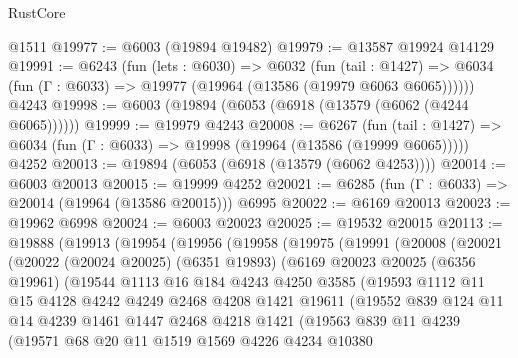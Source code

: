 \begin{lexlean}{RustCore}
\begin{coremodule}
    @1511
@19977 := @6003 (@19894 @19482)
@19979 := @13587 @19924 @14129
@19991 := @6243
    (fun (lets : @6030) =>
    @6032
      (fun (tail : @1427) =>
      @6034 (fun (Γ : @6033) => @19977 (@19964 (@13586 (@19979 @6063 @6065))))))
    @4243
@19998 := @6003 (@19894 (@6053 (@6918 (@13579 (@6062 (@4244 @6065))))))
@19999 := @19979 @4243
@20008 := @6267
    (fun (tail : @1427) => @6034 (fun (Γ : @6033) => @19998 (@19964 (@13586 (@19999 @6065)))))
    @4252
@20013 := @19894 (@6053 (@6918 (@13579 (@6062 @4253))))
@20014 := @6003 @20013
@20015 := @19999 @4252
@20021 := @6285 (fun (Γ : @6033) => @20014 (@19964 (@13586 @20015))) @6995
@20022 := @6169 @20013
@20023 := @19962 @6998
@20024 := @6003 @20023
@20025 := @19532 @20015
@20113 := @19888
    (@19913
      (@19954
        (@19956
          (@19958
            (@19975
              (@19991
                (@20008
                  (@20021
                    (@20022
                      (@20024 @20025)
                      (@6351 @19893)
                      (@6169
                        @20023
                        @20025
                        (@6356 @19961)
                        (@19544
                          @1113
                          @16
                          @184
                          @4243
                          @4250
                          @3585
                          (@19593
                            @1112
                            @11
                            @15
                            @4128
                            @4242
                            @4249
                            @2468
                            @4208
                            @1421
                            @19611
                            (@19552
                              @839
                              @124
                              @11
                              @14
                              @4239
                              @1461
                              @1447
                              @2468
                              @4218
                              @1421
                              (@19563
                                @839
                                @11
                                @4239
                                (@19571
                                  @68
                                  @20
                                  @11
                                  @1519
                                  @1569
                                  @4226
                                  @4234
                                  @10380

\end{coremodule}
\end{lexlean}
